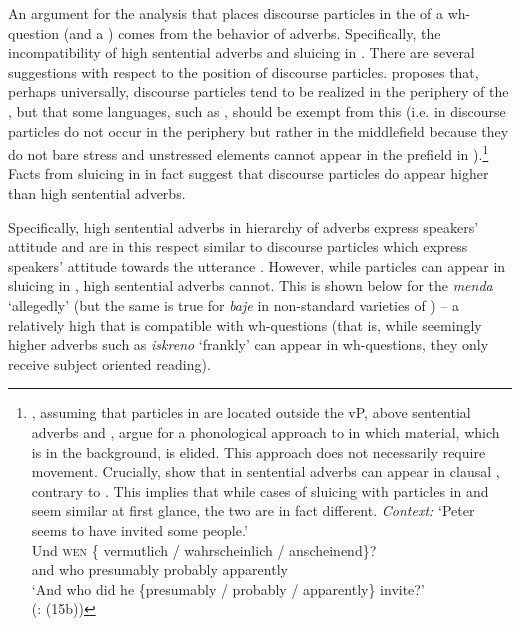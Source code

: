 \documentclass[output=paper,modfonts,newtxmath,hidelinks]{langscibook}
\begin{document}
An argument for the analysis that places discourse particles in the  of a wh-question (and a ) comes from the behavior of adverbs. Specifically, the incompatibility of high sentential adverbs and sluicing in . 
There are several suggestions with respect to the position of discourse particles. \cite{zimmermann2011} proposes that, perhaps universally, discourse particles tend to be realized in the periphery of the , but that some languages, such as , should be exempt from this (i.e. in  discourse particles do not occur in the periphery but rather in the middlefield because they do not bare stress and unstressed elements cannot appear in the prefield in ).\footnote{\cite{ott2016deletion}, assuming that particles in  are located outside the vP, above sentential adverbs and , argue for a phonological approach to  in which material, which is in the background, is elided. This approach does not necessarily require movement. Crucially, \cite{ott2016deletion} show that in  sentential adverbs can appear in clausal , contrary to . This implies that while cases of sluicing with particles in  and  seem similar at first glance, the two are in fact different.
\ea \textit{Context:} `Peter seems to have invited some people.'\\
\gll Und 	\textsc{wen} \{\hspace{-2pt} vermutlich / 	wahrscheinlich / anscheinend\}?\\
and 	who {} presumably {}	probably {}	apparently\\
\glt `And who did he \{presumably / probably / apparently\} invite?'\\\hfill (\citealt{ott2016deletion}: (15b))
\zlast} Facts from sluicing in  in fact suggest that discourse particles do appear higher than high sentential adverbs.


\largerpage
Specifically, high sentential adverbs in  hierarchy of adverbs express speakers' attitude and are in this respect similar to discourse particles which express speakers' attitude towards the utterance \citep{zimmermann2011}. However, while particles can appear in sluicing in , high sentential adverbs cannot. This is shown below for the  \textit{menda} `allegedly' (but the same is true for \textit{baje} in non-standard varieties of ) -- a relatively high  that is compatible with wh-questions (that is, while seemingly higher adverbs such as \textit{iskreno} `frankly' can appear in wh-questions, they only receive subject oriented reading).\largerpage
\end{document}

